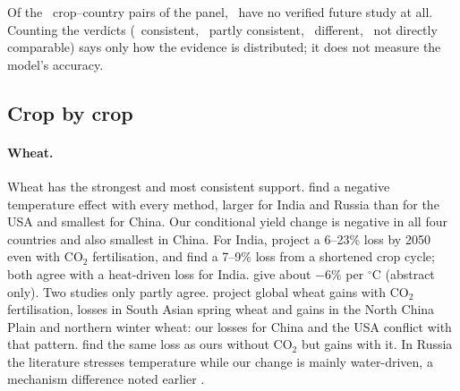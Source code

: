 \begin{table}[H]\centering\scriptsize
\caption[Future-literature coverage by crop]{Coverage of future-impact literature by crop. ``Full / abstract'' counts
rows by read level. Verdict columns: consistent / partly consistent / different / not directly comparable. The last
column lists panel countries for which no verified future study was found.}\label{tab:litcoverage}
\end{table}

Of the \litNPairs\ crop--country pairs of the panel, \litNPairsNoStudy\ have no verified future study at all. Counting
the verdicts (\litNCons\ consistent, \litNPartly\ partly consistent, \litNDiff\ different, \litNNC\ not directly
comparable) says only how the evidence is distributed; it does not measure the model's accuracy.

\subsection{Crop by crop}
\paragraph{Wheat.} Wheat has the strongest and most consistent support. \citet{zhao2017} find a negative temperature
effect with every method, larger for India and Russia than for the USA and smallest for China. Our conditional yield
change is negative in all four countries and also smallest in China. For India, \citet{nareshkumar2014wheat} project a
6--23\% loss by 2050 even with CO$_2$ fertilisation, and \citet{chandran2023} find a 7--9\% loss from a shortened crop
cycle; both agree with a heat-driven loss for India. \citet{asseng2015} give about $-6\%$ per $^\circ$C
(abstract only). Two studies only partly agree. \citet{jagermeyr2021} project global wheat gains with CO$_2$
fertilisation, losses in South Asian spring wheat and gains in the North China Plain and northern winter wheat: our
losses for China and the USA conflict with that pattern. \citet{deryng2014} find the same loss as ours without CO$_2$
but gains with it. In Russia the literature stresses temperature while our change is mainly water-driven, a mechanism
difference noted earlier \citep{lobell2011}.

